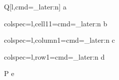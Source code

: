 \documentclass{article}
\begin{document}
\begin{tblr}{Q[l,cmd=\my_later:n]} a \\ \end{tblr}
\begin{tblr}{colspec={l},cell{1}{1}={cmd=\my_later:n}} b \\ \end{tblr}
\begin{tblr}{colspec={l},column{1}={cmd=\my_later:n}} c \\ \end{tblr}
\begin{tblr}{colspec={l},row{1}={cmd=\my_later:n}} d \\ \end{tblr}
\begin{tblr}{P} e \\ \end{tblr}
\ExplSyntaxOff
\end{document}
